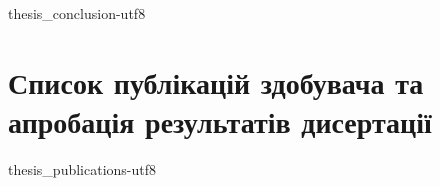 \documentclass[14pt,twoside]{vakthesis}
\begin{document}
{thesis_conclusion-utf8}



%



\appendix

\chapter{Список публікацій здобувача та апробація результатів дисертації}

{thesis_publications-utf8}


\end{document}
